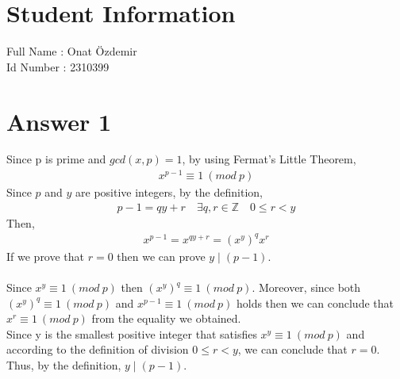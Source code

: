 \documentclass[12pt]{article}
\newcommand{\Z}{\mathbb{Z}}
\begin{document}
\section*{Student Information } 
Full Name : Onat Özdemir \\
Id Number : 2310399 \\

\section*{Answer 1}
Since p is prime and $gcd(x,p) = 1$, by using Fermat's Little Theorem,
\begin{equation*}
\begin{split}
x^{p-1} \equiv 1 \ (mod \ p) 
\end{split}
\end{equation*}
Since $p$ and $y$ are positive integers, by the definition,
\begin{equation*}
\begin{split}
p-1 = qy + r \quad \exists q,r\in \Z \quad 0\leq r < y
\end{split}
\end{equation*}
Then,
\begin{equation*}
\begin{split}
x^{p-1} = x^{qy + r} = (x^{y})^{q}x^{r}
\end{split}
\end{equation*}
If we prove that $r = 0$ then we can prove $ y \mid (p-1)$.\\ \\
Since $x^{y} \equiv 1 \ (mod \ p)$ then $(x^{y})^{q} \equiv 1 \ (mod \ p)$. Moreover, since both $(x^{y})^{q} \equiv 1 \ (mod \ p)$ and 
$x^{p-1} \equiv 1 \ (mod \ p)$ holds then we can conclude that $x^{r} \equiv 1 \ (mod \ p)$ from the equality we obtained. \\
Since y is the smallest positive integer that satisfies $x^{y} \equiv 1 \ (mod \ p)$ and according to the definition of division $0\leq r < y$, we can conclude that $r = 0$.\\
Thus, by the definition, $ y \mid (p-1)$.
\end{document}
